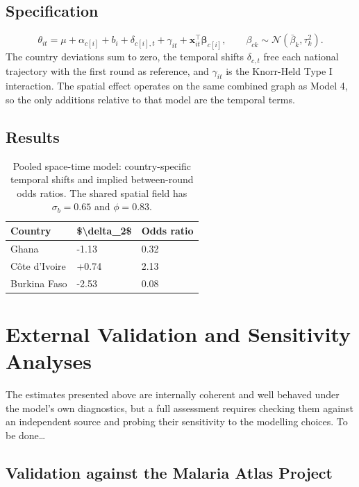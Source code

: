 \documentclass{article}
\begin{document}
\subsection{Specification}\label{specification-3}

\begin{equation}
\theta_{it} = \mu + \alpha_{c[i]} + b_i + \delta_{c[i],t} + \gamma_{it}
              + \mathbf{x}_{it}^{\top}\bm{\beta}_{c[i]},
\qquad
\beta_{ck} \sim \mathcal{N}(\bar{\beta}_k, \tau_k^2).
\end{equation} The country deviations sum to zero, the temporal shifts
\(\delta_{c,t}\) free each national trajectory with the first round as
reference, and \(\gamma_{it}\) is the Knorr-Held Type I interaction. The
spatial effect operates on the same combined graph as Model 4, so the
only additions relative to that model are the temporal terms.

\subsection{Results}\label{results-3}

\begin{longtable}[t]{lll}
\caption{\label{tab:m4-pooled-st}\label{tab:m4}Pooled space-time model: country-specific temporal shifts and implied between-round odds ratios. The shared spatial field has $\sigma_b = 0.65$ and $\phi = 0.83$.}\\
\toprule
Country & \$\textbackslash{}delta\_2\$ & Odds ratio\\
\midrule
Ghana & -1.13 & 0.32\\
Côte d'Ivoire & +0.74 & 2.13\\
Burkina Faso & -2.53 & 0.08\\
\bottomrule
\end{longtable}

\section{External Validation and Sensitivity
Analyses}\label{sec:validation}

The estimates presented above are internally coherent and well behaved
under the model's own diagnostics, but a full assessment requires
checking them against an independent source and probing their
sensitivity to the modelling choices. To be done\ldots{}

\subsection{Validation against the Malaria Atlas
Project}\label{validation-against-the-malaria-atlas-project}
\end{document}
